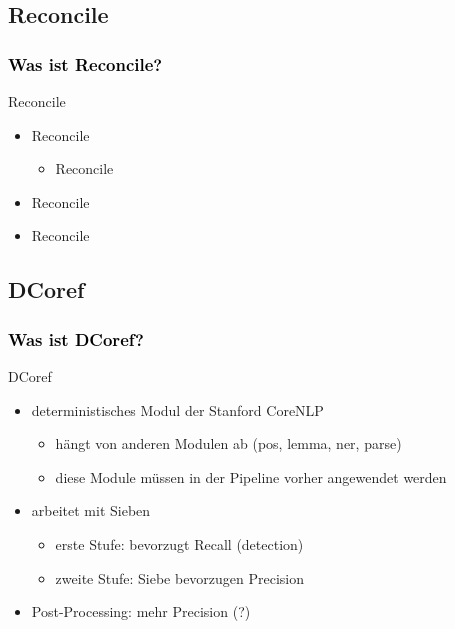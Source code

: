 \documentclass[xcolor=dvipsnames]{beamer}
\begin{document}

\subsection{Reconcile}

\begin{frame}\frametitle{\textcolor{black}{Was ist Reconcile?}}

\begin{block}{Reconcile}
\begin{itemize}
\item Reconcile
\begin{itemize}
\item Reconcile
\end{itemize}
\item Reconcile
\item Reconcile
\end{itemize}
\end{block}

\end{frame}


\subsection{DCoref}

\begin{frame}\frametitle{\textcolor{black}{Was ist DCoref?}}

\begin{block}{DCoref}
\begin{itemize}
\item deterministisches Modul der Stanford CoreNLP
\begin{itemize}
\item hängt von anderen Modulen ab (pos, lemma, ner, parse)
\item diese Module müssen in der Pipeline vorher angewendet werden
\end{itemize}
\item arbeitet mit Sieben
\begin{itemize}
\item erste Stufe: bevorzugt Recall (detection)
\item zweite Stufe: Siebe bevorzugen Precision
\end{itemize} 
\item Post-Processing: mehr Precision (?)
\end{itemize}
\end{block}

\end{frame}
\end{document}
